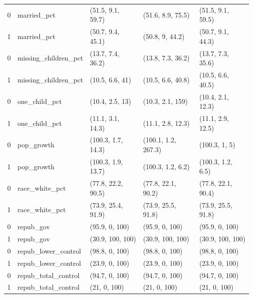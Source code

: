 \begin{table}[ht]
\begin{tabular}{rllll}
  0 & married\_pct & (51.5, 9.1, 59.7) & (51.6, 8.9, 75.5) & (51.5, 9.1, 59.5) \\ 
  1 & married\_pct & (50.7, 9.4, 45.1) & (50.8, 9, 44.2) & (50.7, 9.1, 44.3) \\ 
  0 & missing\_children\_pct & (13.7, 7.4, 36.2) & (13.8, 7.3, 36.2) & (13.7, 7.3, 35.6) \\ 
  1 & missing\_children\_pct & (10.5, 6.6, 41) & (10.5, 6.6, 40.8) & (10.5, 6.6, 40.5) \\ 
  0 & one\_child\_pct & (10.4, 2.5, 13) & (10.3, 2.1, 159) & (10.4, 2.1, 12.3) \\ 
  1 & one\_child\_pct & (11.1, 3.1, 14.3) & (11.1, 2.8, 12.3) & (11.1, 2.9, 12.5) \\ 
  0 & pop\_growth & (100.3, 1.7, 14.3) & (100.1, 1.2, 267.3) & (100.3, 1, 5) \\ 
  1 & pop\_growth & (100.3, 1.9, 13.7) & (100.3, 1.2, 6.2) & (100.3, 1.2, 6.5) \\ 
  0 & race\_white\_pct & (77.8, 22.2, 90.5) & (77.8, 22.1, 90.2) & (77.8, 22.1, 90.4) \\ 
  1 & race\_white\_pct & (73.9, 25.4, 91.9) & (73.9, 25.5, 91.8) & (73.9, 25.5, 91.8) \\ 
  0 & repub\_gov & (95.9, 0, 100) & (95.9, 0, 100) & (95.9, 0, 100) \\ 
  1 & repub\_gov & (30.9, 100, 100) & (30.9, 100, 100) & (30.9, 100, 100) \\
  0 & repub\_lower\_control & (98.8, 0, 100) & (98.8, 0, 100) & (98.8, 0, 100) \\ 
  1 & repub\_lower\_control & (23.9, 0, 100) & (23.9, 0, 100) & (23.9, 0, 100) \\ 
  0 & repub\_total\_control & (94.7, 0, 100) & (94.7, 0, 100) & (94.7, 0, 100) \\ 
  1 & repub\_total\_control & (21, 0, 100) & (21, 0, 100) & (21, 0, 100) \\ 
   \hline
\end{tabular}
\end{table}

